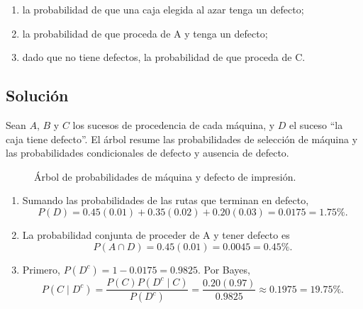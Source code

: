 \documentclass[12pt]{article}
\begin{document}
\begin{enumerate}
    \item la probabilidad de que una caja elegida al azar tenga un defecto;
    \item la probabilidad de que proceda de A y tenga un defecto;
    \item dado que no tiene defectos, la probabilidad de que proceda de C.
\end{enumerate}

\subsection*{Solución}

Sean $A$, $B$ y $C$ los sucesos de procedencia de cada máquina, y $D$ el suceso ``la caja tiene defecto''. El árbol resume las probabilidades de selección de máquina y las probabilidades condicionales de defecto y ausencia de defecto.

\begin{figure}[H]
\centering
{}
\caption{Árbol de probabilidades de máquina y defecto de impresión.}
\label{fig:arbol-galletas}
\end{figure}

\begin{enumerate}
    \item Sumando las probabilidades de las rutas que terminan en defecto,
    \[
    P(D)=0.45(0.01)+0.35(0.02)+0.20(0.03)=0.0175=1.75\%.
    \]
    \item La probabilidad conjunta de proceder de A y tener defecto es
    \[
    P(A\cap D)=0.45(0.01)=0.0045=0.45\%.
    \]
    \item Primero, $P(D^c)=1-0.0175=0.9825$. Por Bayes,
    \[
    P(C\mid D^c)=\frac{P(C)P(D^c\mid C)}{P(D^c)}
    =\frac{0.20(0.97)}{0.9825}
    \approx0.1975=19.75\%.
    \]
\end{enumerate}
\end{document}
